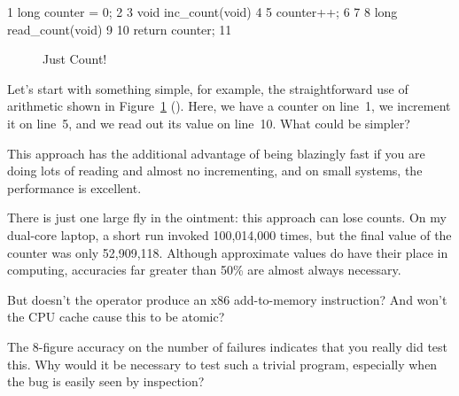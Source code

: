 { \scriptsize
\begin{verbbox}
  1 long counter = 0;
  2 
  3 void inc_count(void)
  4 {
  5   counter++;
  6 }
  7 
  8 long read_count(void)
  9 {
 10   return counter;
 11 }
\end{verbbox}
}
\begin{figure}[hp]
\centering
\theverbbox
\caption{Just Count!}
\label{fig:count:Just Count!}
\end{figure}

Let's start with something simple, for example, the straightforward
use of arithmetic shown in
Figure~\ref{fig:count:Just Count!} ().
Here, we have a counter on line~1, we increment it on line~5, and we
read out its value on line~10.
What could be simpler?

This approach has the additional advantage of being blazingly fast if
you are doing lots of reading and almost no incrementing, and on small
systems, the performance is excellent.

There is just one large fly in the ointment: this approach can lose
counts.
On my dual-core laptop, a short run invoked 
100,014,000 times, but the final value of the counter was only
52,909,118.
Although approximate values do have their place in computing,
accuracies far greater than 50\% are almost always necessary.

\QuickQuiz{}
	But doesn't the \co{++} operator produce an x86 add-to-memory
	instruction?
	And won't the CPU cache cause this to be atomic?
 \QuickQuizEnd

\QuickQuiz{}
	The 8-figure accuracy on the number of failures indicates
	that you really did test this.
	Why would it be necessary to test such a trivial program,
	especially when the bug is easily seen by inspection?
 \QuickQuizEnd

